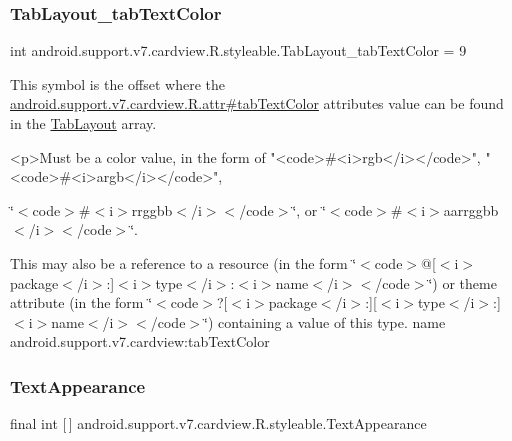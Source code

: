\subsubsection{\texorpdfstring{Tab\+Layout\+\_\+tab\+Text\+Color}{TabLayout\_tabTextColor}}
{\footnotesize\ttfamily int android.\+support.\+v7.\+cardview.\+R.\+styleable.\+Tab\+Layout\+\_\+tab\+Text\+Color = 9\hspace{0.3cm}{\ttfamily [static]}}

This symbol is the offset where the \hyperlink{classandroid_1_1support_1_1v7_1_1cardview_1_1R_1_1attr_aef38b3fa4a5c5d4184041e5dec1e70a7}{android.\+support.\+v7.\+cardview.\+R.\+attr\#tab\+Text\+Color} attribute\textquotesingle{}s value can be found in the \hyperlink{classandroid_1_1support_1_1v7_1_1cardview_1_1R_1_1styleable_afa0dc9366603eaec9e38d99273ba8512}{Tab\+Layout} array.

\begin{DoxyVerb}      <p>Must be a color value, in the form of "<code>#<i>rgb</i></code>", "<code>#<i>argb</i></code>",
\end{DoxyVerb}
 \char`\"{}$<$code$>$\#$<$i$>$rrggbb$<$/i$>$$<$/code$>$\char`\"{}, or \char`\"{}$<$code$>$\#$<$i$>$aarrggbb$<$/i$>$$<$/code$>$\char`\"{}. 

This may also be a reference to a resource (in the form \char`\"{}$<$code$>$@\mbox{[}$<$i$>$package$<$/i$>$\+:\mbox{]}$<$i$>$type$<$/i$>$\+:$<$i$>$name$<$/i$>$$<$/code$>$\char`\"{}) or theme attribute (in the form \char`\"{}$<$code$>$?\mbox{[}$<$i$>$package$<$/i$>$\+:\mbox{]}\mbox{[}$<$i$>$type$<$/i$>$\+:\mbox{]}$<$i$>$name$<$/i$>$$<$/code$>$\char`\"{}) containing a value of this type.  name android.\+support.\+v7.\+cardview\+:tab\+Text\+Color \mbox{\label{classandroid_1_1support_1_1v7_1_1cardview_1_1R_1_1styleable_aac90085e3889272ab1a7da34a6c5ed38}} 
\subsubsection{\texorpdfstring{Text\+Appearance}{TextAppearance}}
{\footnotesize\ttfamily final int \mbox{[}$\,$\mbox{]} android.\+support.\+v7.\+cardview.\+R.\+styleable.\+Text\+Appearance\hspace{0.3cm}{\ttfamily [static]}}

